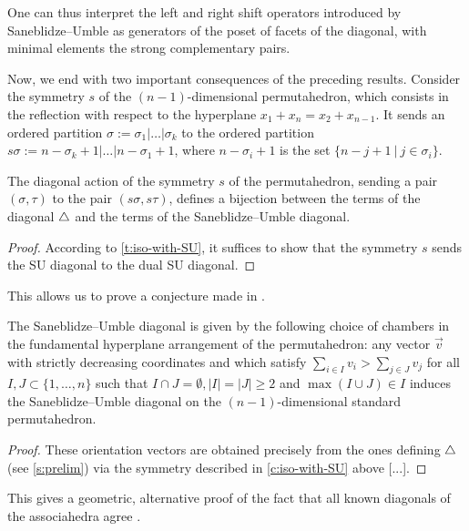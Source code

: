 One can thus interpret the left and right shift operators introduced by Saneblidze--Umble as generators of the poset of facets of the diagonal, with minimal elements the strong complementary pairs.

Now, we end with two important consequences of the preceding results. 
Consider the symmetry $s$ of the $(n-1)$-dimensional permutahedron, which consists in the reflection with respect to the hyperplane $x_1 + x_n = x_2 + x_{n-1}$. 
It sends an ordered partition $\sigma:=\sigma_1 | \ldots | \sigma_k$ to the ordered partition $s\sigma:=n-\sigma_{k}+1 | \ldots | n-\sigma_{1}+1$, where $n-\sigma_i+1$ is the set $\{n-j+1 \ | \ j \in \sigma_i\}$. 

\begin{corollary}
\label{c:iso-with-SU}
The diagonal action of the symmetry $s$ of the permutahedron, sending a pair $(\sigma,\tau)$ to the pair $(s\sigma,s\tau)$, defines a bijection between the terms of the diagonal $\triangle$ and the terms of the Saneblidze--Umble diagonal.
\end{corollary}

\begin{proof}
According to \cref{t:iso-with-SU}, it suffices to show that the symmetry $s$ sends the SU diagonal to the dual SU diagonal. 
\end{proof}

This allows us to prove a conjecture made in \cite[Remark 3.19]{LA21}.

\begin{corollary}
    The Saneblidze--Umble diagonal is given by the following choice of chambers in the fundamental hyperplane arrangement of the permutahedron: any vector $\vec v$ with strictly decreasing coordinates and which satisfy $\sum_{i \in I} v_i > \sum_{j \in J} v_j$ for all $I,J \subset \{1, \ldots, n\}$ such that $I \cap J = \emptyset, |I|=|J| \geq 2$ and $\max(I \cup J) \in I$ induces the Saneblidze--Umble diagonal on the $(n-1)$-dimensional standard permutahedron. 
\end{corollary}

\begin{proof}
    These orientation vectors are obtained precisely from the ones defining $\triangle$ (see \cref{s:prelim}) via the symmetry described in \cref{c:iso-with-SU} above [...]. 
\end{proof}

This gives a geometric, alternative proof of the fact that all known diagonals of the associahedra agree \cite{saneblidzeComparingDiagonalsAssociahedra2022}.

